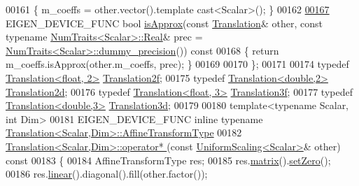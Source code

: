 \begin{DoxyCode}
00161   \{ m\_coeffs = other.vector().template cast<Scalar>(); \}
00162 
\hyperlink{group___geometry___module_a3610eaa76745dd8f2c76dd9cc949dfa5}{00167}   EIGEN\_DEVICE\_FUNC \textcolor{keywordtype}{bool} \hyperlink{group___geometry___module_a3610eaa76745dd8f2c76dd9cc949dfa5}{isApprox}(\textcolor{keyword}{const} \hyperlink{group___geometry___module_class_eigen_1_1_translation}{Translation}& other, \textcolor{keyword}{const} \textcolor{keyword}{typename} 
      \hyperlink{group___core___module_struct_eigen_1_1_num_traits}{NumTraits<Scalar>::Real}& prec = 
      \hyperlink{group___core___module_struct_eigen_1_1_num_traits}{NumTraits<Scalar>::dummy\_precision}())\textcolor{keyword}{ const}
00168 \textcolor{keyword}{  }\{ \textcolor{keywordflow}{return} m\_coeffs.isApprox(other.m\_coeffs, prec); \}
00169 
00170 \};
00171 
00174 \textcolor{keyword}{typedef} \hyperlink{group___geometry___module_class_eigen_1_1_translation}{Translation<float, 2>} \hyperlink{group___geometry___module_class_eigen_1_1_translation}{Translation2f};
00175 \textcolor{keyword}{typedef} \hyperlink{group___geometry___module_class_eigen_1_1_translation}{Translation<double,2>} \hyperlink{group___geometry___module_class_eigen_1_1_translation}{Translation2d};
00176 \textcolor{keyword}{typedef} \hyperlink{group___geometry___module_class_eigen_1_1_translation}{Translation<float, 3>} \hyperlink{group___geometry___module_class_eigen_1_1_translation}{Translation3f};
00177 \textcolor{keyword}{typedef} \hyperlink{group___geometry___module_class_eigen_1_1_translation}{Translation<double,3>} \hyperlink{group___geometry___module_class_eigen_1_1_translation}{Translation3d};
00179 
00180 \textcolor{keyword}{template}<\textcolor{keyword}{typename} Scalar, \textcolor{keywordtype}{int} Dim>
00181 EIGEN\_DEVICE\_FUNC \textcolor{keyword}{inline} \textcolor{keyword}{typename} \hyperlink{group___geometry___module_class_eigen_1_1_transform}{Translation<Scalar,Dim>::AffineTransformType}
00182 \hyperlink{group___geometry___module_abfbbd7dee9da6e449439a138c6ce9068}{Translation<Scalar,Dim>::operator* }(\textcolor{keyword}{const} 
      \hyperlink{class_eigen_1_1_uniform_scaling}{UniformScaling<Scalar>}& other)\textcolor{keyword}{ const}
00183 \textcolor{keyword}{}\{
00184   AffineTransformType res;
00185   res.\hyperlink{group___geometry___module_aec8168000a88a807130d41020af98d47}{matrix}().\hyperlink{class_eigen_1_1_plain_object_base_ac21ad5f989f320e46958b75ac8d9a1da}{setZero}();
00186   res.\hyperlink{group___geometry___module_a535bd63d047c2a36585c3f9b62219a1e}{linear}().diagonal().fill(other.factor());

\end{DoxyCode}
